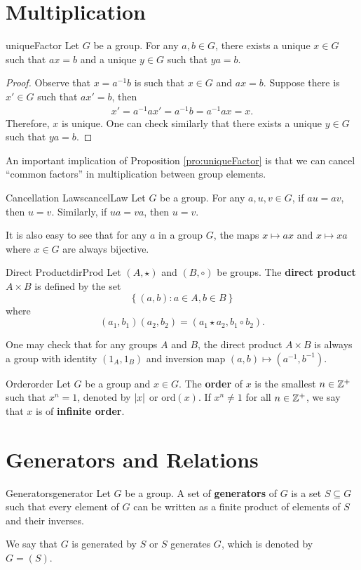 \documentclass[math, code]{amznotes}
\theoremstyle{remark}
\begin{document}
\section{Multiplication}
\begin{probox}{}{uniqueFactor}
    Let $G$ be a group. For any $a, b \in G$, there exists a unique $x \in G$ such that $ax = b$ and a unique $y \in G$ such that $ya = b$.
    \tcblower
    \begin{proof}
        Observe that $x = a^{-1}b$ is such that $x \in G$ and $ax = b$. Suppose there is $x' \in G$ such that $ax' = b$, then
        \begin{align*}
            x' = a^{-1}ax' = a^{-1}b = a^{-1}ax = x.
        \end{align*}
        Therefore, $x$ is unique. One can check similarly that there exists a unique $y \in G$ such that $ya = b$.
    \end{proof}
\end{probox}
An important implication of Proposition \ref{pro:uniqueFactor} is that we can cancel ``common factors'' in multiplication between group elements.
\begin{corbox}{Cancellation Laws}{cancelLaw}
    Let $G$ be a group. For any $a, u, v \in G$, if $au = av$, then $u = v$. Similarly, if $ua = va$, then $u = v$.
\end{corbox}
It is also easy to see that for any $a$ in a group $G$, the maps $x \mapsto ax$ and $x \mapsto xa$ where $x \in G$ are always bijective.
\begin{dfnbox}{Direct Product}{dirProd}
    Let $(A, \star)$ and $(B, \circ)$ be groups. The {\color{red} \textbf{direct product}} $A \times B$ is defined by the set
    \begin{equation*}
        \left\{(a, b) \colon a \in A, b \in B\right\}
    \end{equation*}
    where
    \begin{equation*}
        (a_1, b_1)(a_2, b_2) = (a_1 \star a_2, b_1 \circ b_2).
    \end{equation*}
\end{dfnbox}
One may check that for  any groups $A$ and $B$, the direct product $A \times B$ is always a group with identity $(1_A, 1_B)$ and inversion map $(a, b) \mapsto (a^{-1}, b^{-1})$.
\begin{dfnbox}{Order}{order}
    Let $G$ be a group and $x \in G$. The {\color{red} \textbf{order}} of $x$ is the smallest $n \in \mathbb{Z}^+$ such that $x^n = 1$, denoted by ${\left\lvert {x} \right\rvert}$ or $\mathrm{ord}(x)$. If $x^n \neq 1$ for all $n \in \mathbb{Z}^+$, we say that $x$ is of {\color{red} \textbf{infinite order}}.
\end{dfnbox}

\section{Generators and Relations}
\begin{dfnbox}{Generators}{generator}
    Let $G$ be a group. A set of {\color{red} \textbf{generators}} of $G$ is a set $S \subseteq G$ such that every element of $G$ can be written as a finite product of elements of $S$ and their inverses.
\end{dfnbox}
We say that $G$ is generated by $S$ or $S$ generates $G$, which is denoted by $G = (S)$.
\end{document}
